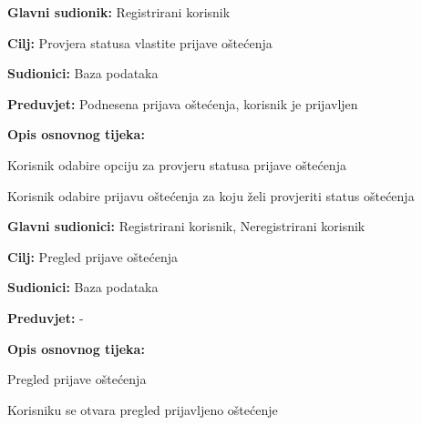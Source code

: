 \noindent {}
\begin{packed_item}

	\item \textbf{Glavni sudionik: } Registrirani korisnik
	\item  \textbf{Cilj:} Provjera statusa vlastite prijave oštećenja
	\item  \textbf{Sudionici:} Baza podataka
	\item  \textbf{Preduvjet:} Podnesena prijava oštećenja, korisnik je prijavljen
	\item  \textbf{Opis osnovnog tijeka:}

	\item[] \begin{packed_enum}

		\item Korisnik odabire opciju za provjeru statusa prijave oštećenja
		\item Korisnik odabire prijavu oštećenja za koju želi provjeriti status oštećenja
	\end{packed_enum}
\end{packed_item}


\noindent {}
\begin{packed_item}

	\item \textbf{Glavni sudionici: } Registrirani korisnik, Neregistrirani korisnik
	\item  \textbf{Cilj:} Pregled prijave oštećenja
	\item  \textbf{Sudionici:} Baza podataka
	\item  \textbf{Preduvjet:} -
	\item  \textbf{Opis osnovnog tijeka:}

	\item[] \begin{packed_enum}

		\item Pregled prijave oštećenja
		\item Korisniku se otvara pregled prijavljeno oštećenje 
	\end{packed_enum}
\end{packed_item}


